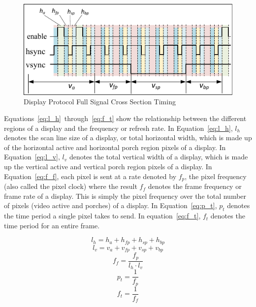     \begin{figure}[H]
        \centering
        \includegraphics[width=1.0\textwidth]{fig/display_timing_full_cross.pdf}
        \caption{Display Protocol Full Signal Cross Section Timing}
        \label{fig:display_protocol_full_cross}
    \end{figure}

    Equations~\eqref{eq:l_h}~through~\eqref{eq:f_t} show the relationship between the different regions of a display and the frequency or refresh rate. In Equation~\eqref{eq:l_h}, $l_h$ denotes the scan line size of a display, or total horizontal width, which is made up of the horizontal active and horizontal porch region pixels of a display. In Equation~\eqref{eq:l_v}, $l_v$ denotes the total vertical width of a display, which is made up the vertical active and vertical porch region pixels of a display. In Equation~\eqref{eq:f_f}, each pixel is sent at a rate denoted by $f_p$, the pixel frequency (also called the pixel clock) where the result $f_f$ denotes the frame frequency or frame rate of a display. This is simply the pixel frequency over the total number of pixels (video active and porches) of a display. In Equation~\eqref{eq:p_t}, $p_t$ denotes the time period a single pixel takes to send. In equation~\eqref{eq:f_t}, $f_t$ denotes the time period for an entire frame.


    \begin{equation}
        l_h=h_a+h_{fp}+h_{sp}+h_{bp}
        \label{eq:l_h}
    \end{equation}
    \begin{equation}
        l_v=v_a+v_{fp}+v_{sp}+v_{bp}
        \label{eq:l_v}
    \end{equation}
    \begin{equation}
        f_f={\frac{f_p}{l_h \cdot l_v}}
        \label{eq:f_f}
    \end{equation}
    \begin{equation}
        p_t={\frac{1}{f_p}}
        \label{eq:p_t}
    \end{equation}
    \begin{equation}
        f_t={\frac{1}{f_f}}
        \label{eq:f_t}
    \end{equation}

